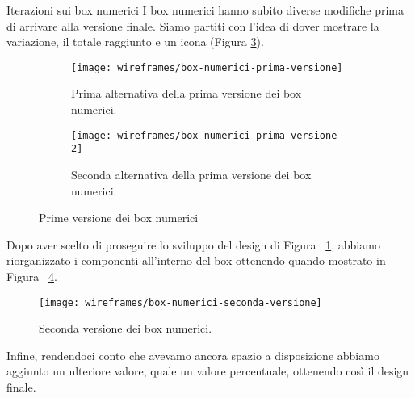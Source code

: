 \documentclass[../../../main.tex]{subfiles}
\begin{document}
\begin{bclogo}{Iterazioni sui box numerici}
    I box numerici hanno subito diverse modifiche prima di arrivare alla versione finale. Siamo partiti con l'idea di dover mostrare la variazione, il totale raggiunto e un icona (Figura \ref{fig:box-numerici-prima-versione}).
\begin{figure}[H]
    \begin{subfigure}[b]{0.5\textwidth}
        \centering
        \texttt{[image: wireframes/box-numerici-prima-versione]}
        \caption{Prima alternativa della prima versione dei box numerici.}
        \label{fig:box-numerici-prima-versione1}
    \end{subfigure}
    \begin{subfigure}[b]{0.5\textwidth}
        \centering
        \texttt{[image: wireframes/box-numerici-prima-versione-2]}
        \caption{Seconda alternativa della prima versione dei box numerici.}
        \label{fig:box-numerici-prima-versione2}
    \end{subfigure}
    \caption{Prime versione dei box numerici}
    \label{fig:box-numerici-prima-versione}
\end{figure}

Dopo aver scelto di proseguire lo sviluppo del design di Figura ~\ref{fig:box-numerici-prima-versione1}, abbiamo riorganizzato i componenti all'interno del box ottenendo quando mostrato in Figura ~\ref{fig:box-numerici-seconda-versione}.

\begin{figure}[H]
    \centering
    \texttt{[image: wireframes/box-numerici-seconda-versione]}
    \caption{Seconda versione dei box numerici.}
    \label{fig:box-numerici-seconda-versione}
\end{figure}

Infine, rendendoci conto che avevamo ancora spazio a disposizione abbiamo aggiunto un ulteriore valore, quale un valore percentuale, ottenendo così il design finale.
\end{bclogo}
\clearpage
\end{document}
